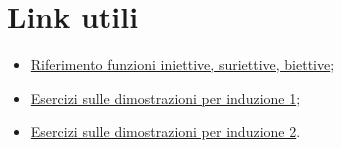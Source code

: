 \chapter*{Link utili}

\begin{itemize}
    \item \href{http://unina.stidue.net/Analisi%20Matematica%201/Materiale/Francesco%20Poli/07%20funzioni%20iniettive%20e%20suriettive%20-%20cardinalita.pdf}{Riferimento funzioni iniettive, suriettive, biettive};
    \item \href{https://online.scuola.zanichelli.it/bergamini_azzurro-2ed-files/Triennio/Bergamini_approfondimento_35227_principioinduzione.pdf}{Esercizi sulle dimostrazioni per induzione 1};
    \item \href{https://www.docenti.unina.it/webdocenti-be/allegati/materiale-didattico/655639}{Esercizi sulle dimostrazioni per induzione 2}.
\end{itemize}

